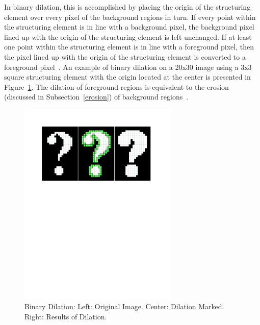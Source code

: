 \documentclass{sig-alternate}
\begin{document}
In binary dilation, this is accomplished by placing the origin of the structuring element over every pixel of the background regions in turn. If every point within the structuring element is in line with a background pixel, the background pixel lined up with the origin of the structuring element is left unchanged. If at least one point within the structuring element is in line with a foreground pixel, then the pixel lined up with the origin of the structuring element is converted to a foreground pixel~\cite{MorphologyWiki}. An example of binary dilation on a 20x30 image using a 3x3 square structuring element with the origin located at the center is presented in Figure~\ref{binary dilation figure}. The dilation of foreground regions is equivalent to the erosion (discussed in Subsection~\ref{erosion}) of background regions~\cite{MorphologyWiki}.
\begin{figure}
\centering
\includegraphics[width=3in,trim={0 6.75in 0 0},clip]{dilation}
\caption{Binary Dilation: Left: Original Image. Center: Dilation Marked. Right: Results of Dilation.}
\label{binary dilation figure}
\end{figure}
\end{document}

